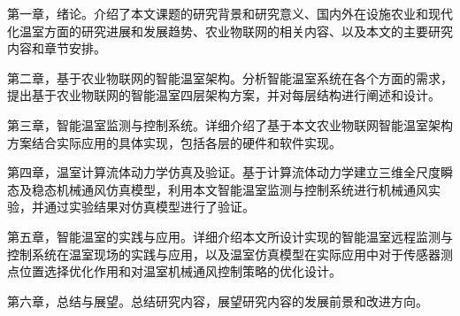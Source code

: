第一章，绪论。介绍了本文课题的研究背景和研究意义、国内外在设施农业和现代化温室方面的研究进展和发展趋势、农业物联网的相关内容、以及本文的主要研究内容和章节安排。

第二章，基于农业物联网的智能温室架构。分析智能温室系统在各个方面的需求，提出基于农业物联网的智能温室四层架构方案，并对每层结构进行阐述和设计。

第三章，智能温室监测与控制系统。详细介绍了基于本文农业物联网智能温室架构方案结合实际应用的具体实现，包括各层的硬件和软件实现。

第四章，温室计算流体动力学仿真及验证。基于计算流体动力学建立三维全尺度瞬态及稳态机械通风仿真模型，利用本文智能温室监测与控制系统进行机械通风实验，并通过实验结果对仿真模型进行了验证。

第五章，智能温室的实践与应用。详细介绍本文所设计实现的智能温室远程监测与控制系统在温室现场的实践与应用，以及温室仿真模型在实际应用中对于传感器测点位置选择优化作用和对温室机械通风控制策略的优化设计。

第六章，总结与展望。总结研究内容，展望研究内容的发展前景和改进方向。